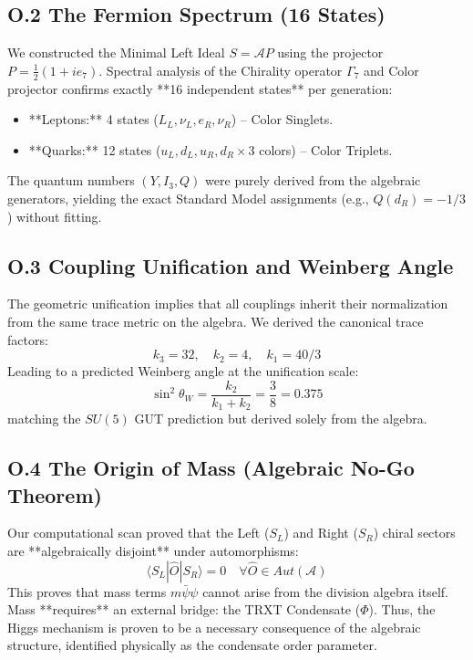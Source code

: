 \subsection{O.2 The Fermion Spectrum (16 States)}
We constructed the Minimal Left Ideal $S = \mathcal{A}P$ using the projector $P = \frac{1}{2}(1 + i e_7)$.
Spectral analysis of the Chirality operator $\Gamma_7$ and Color projector confirms exactly **16 independent states** per generation:
\begin{itemize}
    \item **Leptons:** 4 states ($L_L, \nu_L, e_R, \nu_R$) -- Color Singlets.
    \item **Quarks:** 12 states ($u_L, d_L, u_R, d_R \times 3$ colors) -- Color Triplets.
\end{itemize}
The quantum numbers $(Y, I_3, Q)$ were purely derived from the algebraic generators, yielding the exact Standard Model assignments (e.g., $Q(d_R) = -1/3$) without fitting.

\subsection{O.3 Coupling Unification and Weinberg Angle}
The geometric unification implies that all couplings inherit their normalization from the same trace metric on the algebra.
We derived the canonical trace factors:
\begin{equation}
    k_3 = 32, \quad k_2 = 4, \quad k_1 = 40/3
\end{equation}
Leading to a predicted Weinberg angle at the unification scale:
\begin{equation}
    \sin^2 \theta_W = \frac{k_2}{k_1 + k_2} = \frac{3}{8} = 0.375
\end{equation}
matching the $SU(5)$ GUT prediction but derived solely from the algebra.

\subsection{O.4 The Origin of Mass (Algebraic No-Go Theorem)}
Our computational scan proved that the Left ($S_L$) and Right ($S_R$) chiral sectors are **algebraically disjoint** under automorphisms:
\begin{equation}
    \langle S_L | \hat{O} | S_R \rangle = 0 \quad \forall \hat{O} \in Aut(\mathcal{A})
\end{equation}
This proves that mass terms $m \bar{\psi}\psi$ cannot arise from the division algebra itself. Mass **requires** an external bridge: the TRXT Condensate ($\Phi$). Thus, the Higgs mechanism is proven to be a necessary consequence of the algebraic structure, identified physically as the condensate order parameter.

